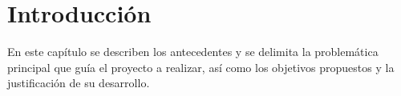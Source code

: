 \chapter{Introducción}
\label{cap:reqUsr}

En este capítulo se describen los antecedentes y se delimita la problemática principal que guía el proyecto a realizar, así como los objetivos propuestos y la justificación de su desarrollo.








